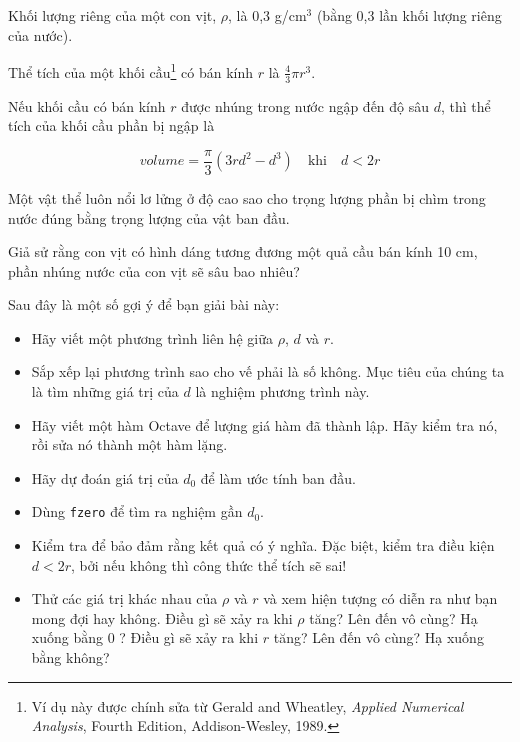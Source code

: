 \documentclass[12pt]{book}
\begin{document}
\begin{ex}
\label{duck}

Khối lượng riêng của một con vịt, $\rho$, là 0,3 g/cm${}^3$ (bằng 0,3 
lần khối lượng riêng của nước).

Thể tích của một khối cầu\footnote{Ví dụ này được chính sửa từ Gerald
and Wheatley, {\em Applied Numerical Analysis}, Fourth Edition,
Addison-Wesley, 1989.} có bán kính $r$ là $\frac{4}{3} \pi r^3$.

Nếu khối cầu có bán kính $r$ được nhúng trong nước ngập đến độ sâu $d$, 
thì thể tích của khối cầu phần bị ngập là

\[ volume = \frac{\pi}{3} (3r d^2 - d^3) \quad 
\mbox{khi} \quad d < 2 r \]

Một vật thể luôn nổi lơ lửng ở độ cao sao cho trọng lượng phần bị chìm 
trong nước đúng bằng trọng lượng của vật ban đầu.

Giả sử rằng con vịt có hình dáng tương đương một quả cầu bán kính 10 cm,
phần nhúng nước của con vịt sẽ sâu bao nhiêu?

Sau đây là một số gợi ý để bạn giải bài này:

\begin{itemize}

\item Hãy viết một phương trình liên hệ giữa $\rho$, $d$ và $r$.

\item Sắp xếp lại phương trình sao cho vế phải là số không.
Mục tiêu của chúng ta là tìm những giá trị của $d$ là nghiệm phương trình này.

\item Hãy viết một hàm Octave để lượng giá hàm đã thành lập. Hãy kiểm tra
   nó, rồi sửa nó thành một hàm lặng.

\item Hãy dự đoán giá trị của $d_0$ để làm ước tính ban đầu.

\item Dùng {\tt fzero} để tìm ra nghiệm gần $d_0$.

\item Kiểm tra để bảo đảm rằng kết quả có ý nghĩa. Đặc biệt, kiểm tra
   điều kiện $d < 2 r$, bởi nếu không thì công thức thể tích sẽ sai!

\item Thử các giá trị khác nhau của $\rho$ và $r$ và xem hiện tượng có diễn ra
như bạn mong đợi hay không. Điều gì sẽ xảy ra khi $\rho$ tăng? Lên đến
vô cùng? Hạ xuống bằng 0 ? Điều gì sẽ xảy ra khi $r$ tăng?  Lên đến vô cùng?
Hạ xuống bằng không?

\end{itemize}


\end{ex}
\end{document}
